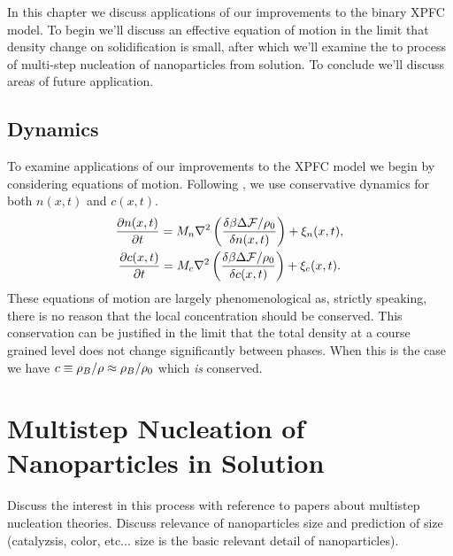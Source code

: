 \label{chapter:applications}

In this chapter we discuss applications of our improvements to the binary XPFC
model.  To begin we'll discuss an effective equation of motion in the limit
that density change on solidification is small, after which we'll examine the
to process of multi-step nucleation of nanoparticles from solution. To conclude
we'll discuss areas of future application.

\subsection{Dynamics} %

To examine applications of our improvements to the XPFC model we begin 
by considering equations of motion. Following \cite{GREENWOOD11_BINARY},
we use conservative dynamics for both $n(x, t)$ and $c(x, t)$.
%
\begin{gather}
    \frac{\partial n(x, t)}{\partial t} = 
        M_n \nabla^2\left(\frac{\delta \beta \Delta\mathcal{F} / \rho_0}{\delta n(x, t)}\right) 
        + \xi_n(x, t), \\ 
    \frac{\partial c(x, t)}{\partial t} = 
        M_c \nabla^2\left(\frac{\delta \beta \Delta \mathcal{F} / \rho_0}{\delta c(x, t)}\right)
        + \xi_c(x, t).
\end{gather}
%
These equations of motion are largely phenomenological as, strictly speaking,
there is no reason that the local concentration should be conserved.  This
conservation can be justified in the limit that the total density at a course
grained level does not change significantly between phases. When this is the
case we have $c \equiv \rho_B / \rho \approx \rho_B / \rho_0$ which \textit{is}
conserved.

\section{Multistep Nucleation of Nanoparticles in Solution} %

{
    \color{ForestGreen} Discuss the interest in this process with reference to 
    papers about multistep nucleation theories. Discuss relevance of nanoparticles
    size and prediction of size (catalyzsis, color, etc... size is the basic relevant
    detail of nanoparticles).
}

